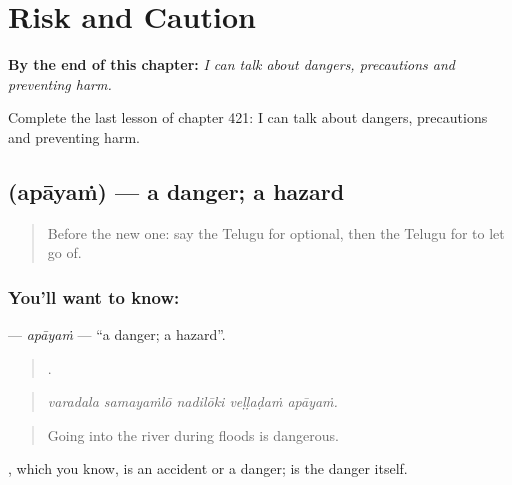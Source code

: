 
\chapter{Risk and Caution}
\label{ch:te-risk-and-caution}

\begin{chapteropening}
\textbf{By the end of this chapter:} \emph{I can talk about dangers, precautions and preventing harm.}

Complete the last lesson of chapter 421: I can talk about dangers, precautions and preventing harm.
\end{chapteropening}

\section[\texorpdfstring{\te{అపాయం} (apāyaṁ)}{అపాయం (apāyaṁ)}]{ (apāyaṁ) — a danger; a hazard}

\label{lesson:TE-C421-apayam}



\begin{quote}
Before the new one: say the Telugu for optional, then the Telugu for to let go of.
\end{quote}

\subsection*{You'll want to know: }
\textbf{} — \emph{apāyaṁ} — \textquotedblleft{}a danger; a hazard\textquotedblright{}.

\begin{quote}
    .
\end{quote}

\begin{quote}
\emph{varadala samayaṁlō nadilōki veḷḷaḍaṁ apāyaṁ.}
\end{quote}

\begin{quote}
Going into the river during floods is dangerous.
\end{quote}

, which you know, is an accident or a danger;  is the danger itself.

